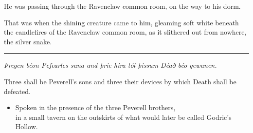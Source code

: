 He was passing through the Ravenclaw common room, on the way to his
dorm.

That was when the shining creature came to him, gleaming soft white
beneath the candlefires of the Ravenclaw common room, as it slithered
out from nowhere, the silver snake.

\begin{center}\rule{3in}{0.4pt}\end{center}

\emph{Þregen béon Pefearles suna and þrie hira tól þissum Déað béo
gewunen.}

Three shall be Peverell's sons and three their devices by which Death
shall be defeated.

\begin{itemize}
\itemsep1pt\parskip0pt
\item
  Spoken in the presence of the three Peverell brothers,\\ in a small
  tavern on the outskirts of what would later be called Godric's Hollow.
\end{itemize}
